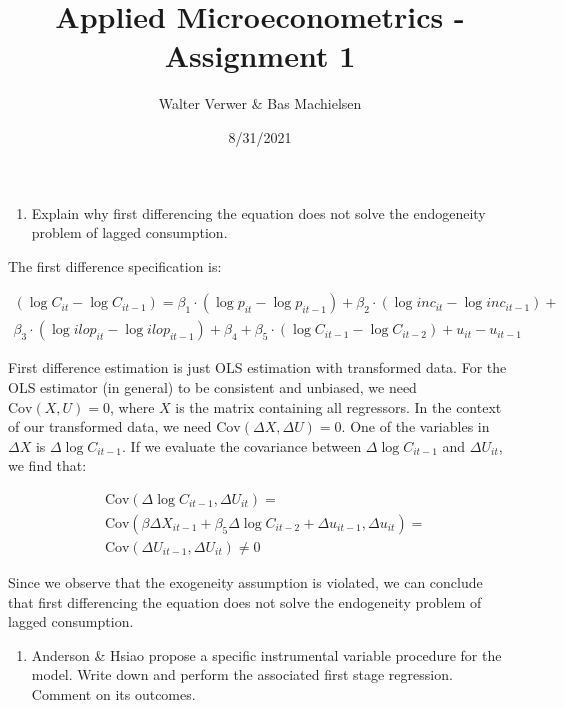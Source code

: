 \documentclass[
]{article}
\title{Applied Microeconometrics - Assignment 1}
\author{Walter Verwer \& Bas Machielsen}
\date{8/31/2021}
\providecommand{\tightlist}{%
  \setlength{\itemsep}{0pt}\setlength{\parskip}{0pt}}
\begin{document}
\maketitle

\begin{enumerate}
\def\labelenumi{\arabic{enumi}.}
\tightlist
\item
  Explain why first differencing the equation does not solve the
  endogeneity problem of lagged consumption.
\end{enumerate}

The first difference specification is:

\begin{align*}
(\log C_{it} - \log C_{it-1}) = \beta_1 \cdot (\log p_{it} - \log p_{it-1}) + \beta_2 \cdot (\log inc_{it} - \log inc_{it-1}) + \\
\beta_3 \cdot (\log ilop_{it} - \log ilop_{it-1}) + \beta_4 + \beta_5 \cdot (\log C_{it-1} - \log C_{it-2}) + u_{it} - u_{it-1}
\end{align*}

First difference estimation is just OLS estimation with transformed
data. For the OLS estimator (in general) to be consistent and unbiased,
we need \(\text{Cov}(X, U)=0\), where \(X\) is the matrix containing all
regressors. In the context of our transformed data, we need
\(\text{Cov}(\Delta X, \Delta U)=0\). One of the variables in
\(\Delta X\) is \(\Delta \log C_{it-1}\). If we evaluate the covariance
between \(\Delta \log C_{it-1}\) and \(\Delta U_{it}\), we find that:

\begin{align*}
&\text{Cov}(\Delta \log C_{it-1}, \Delta U_{it}) = \\
&\text{Cov}(\beta \Delta X_{it-1} + \beta_5 \Delta \log C_{it-2} + \Delta u_{it-1}, \Delta u_{it}) = \\
&\text{Cov}(\Delta U_{it-1}, \Delta U_{it}) \neq 0
\end{align*}

Since we observe that the exogeneity assumption is violated, we can
conclude that first differencing the equation does not solve the
endogeneity problem of lagged consumption.

\begin{enumerate}
\def\labelenumi{\arabic{enumi}.}
\setcounter{enumi}{1}
\tightlist
\item
  Anderson \& Hsiao propose a specific instrumental variable procedure
  for the model. Write down and perform the associated first stage
  regression. Comment on its outcomes.
\end{enumerate}
\end{document}
